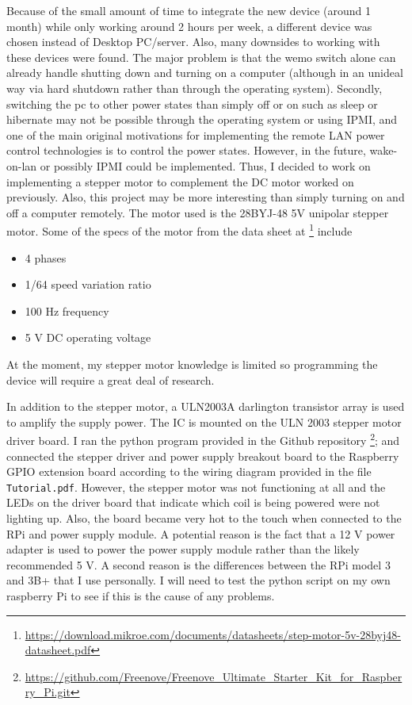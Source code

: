 \documentclass[fontsize=11pt, %
                             paper=letter, %
                             twoside, %
                             captions=tableheading,
                             index=totoc,
                             hyperref]{labbook}
\begin{document}
\begin{addmargin}[0cm]{0cm}
Because of the small amount of time to integrate the new device (around 1 month) while only working around 2 hours per week, a different device was chosen instead of Desktop PC/server. Also, many downsides to working with these devices were found. The major problem is that the wemo switch alone can already handle shutting down and turning on a computer (although in an unideal way via hard shutdown rather than through the operating system). Secondly, switching the pc to other power states than simply off or on such as sleep or hibernate may not be possible through the operating system or using IPMI, and one of the main original motivations for implementing the remote LAN power control technologies is to control the power states. However, in the future, wake-on-lan or possibly IPMI could be implemented.
\smallbreak\noindent
Thus, I decided to work on implementing a stepper motor to complement the DC motor worked on previously. Also, this project may be more interesting than simply turning on and off a computer remotely. The motor used is the 28BYJ-48 5V unipolar stepper motor. Some of the specs of the motor from the data sheet at \footnote{\url{https://download.mikroe.com/documents/datasheets/step-motor-5v-28byj48-datasheet.pdf}} include
\begin{itemize}
\item 4 phases
\item 1/64 speed variation ratio
\item 100 Hz frequency
\item 5 V DC operating voltage
\end{itemize}
At the moment, my stepper motor knowledge is limited so programming the device will require a great deal of research.

In addition to the stepper motor, a ULN2003A darlington transistor array is used to amplify the supply power. The IC is mounted on the ULN 2003 stepper motor driver board. I ran the python program provided in the Github repository \footnote{\url{https://github.com/Freenove/Freenove_Ultimate_Starter_Kit_for_Raspberry_Pi.git}}; and connected the stepper driver and power supply breakout board to the Raspberry GPIO extension board according to the wiring diagram provided in the file \texttt{Tutorial.pdf}. However, the stepper motor was not functioning at all and the LEDs on the driver board that indicate which coil is being powered were not lighting up. Also, the board became very hot to the touch when connected to the RPi and power supply module. A potential reason is the fact that a 12 V power adapter is used to power the power supply module rather than the likely recommended 5 V. A second reason is the differences between the RPi model 3 and 3B+ that I use personally. I will need to test the python script on my own raspberry Pi to see if this is the cause of any problems. 
\end{addmargin}
\end{document}
